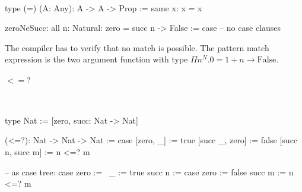 \ \begin{alba}
    type (=) (A: Any): A -> A -> Prop :=
        same {x}: x = x

    zeroNeSucc: all {n: Natural}: zero = succ n -> False :=
        case
            -- no case clauses
\end{alba}

The compiler has to verify that no match is possible. The pattern match
expression is the two argument function with type $\Pi n^N. 0 = 1 + n \to
\text{False}$.



\paragraph{$<=?$}
\ \begin{alba}
    type Nat := [zero, succ: Nat -> Nat]

    (<=?): Nat -> Nat -> Nat := case
        [zero, _]        :=  true
        [succ _, zero]   :=  false
        [succ n, succ m] :=  n <=? m

    -- as case tree:
    case
        zero           :=   \ _ := true
        succ n :=
            case
                zero   :=   false
                succ m :=   n <=? m
\end{alba}

